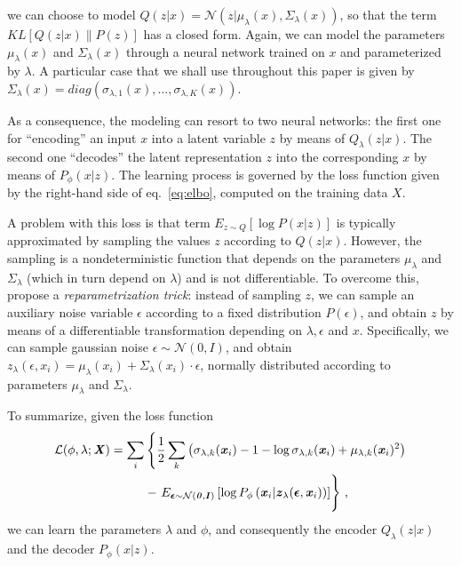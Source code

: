 \documentclass[sigconf]{acmart}
\newcommand{\bs}[1]{\ensuremath{\bm{\mathit{#1}}}}
\numberwithin{equation}{section}
\begin{document}
we can choose to model  $Q(\bs{z}|\bs{x}) = \mathcal{N}(\bs{z}|\mu_\lambda(\bs{x}),
\Sigma_\lambda(\bs{x}))$, so that the term $\mathit{KL}\left[Q(\bs{z}|\bs{x})  \|
  P(\bs{z})\right]$ has a closed form.  
Again, we can model the parameters $\mu_\lambda(\bs{x})$
and $\Sigma_\lambda(\bs{x})$ through a neural
network trained on $\bs{x}$ and parameterized by $\lambda$. A
particular case that we shall use throughout this paper is given by 
$\bs{\Sigma}_\lambda (\bs{x}) = \mathit{diag}\left(\sigma_{\lambda,1}
  (\bs{x}), \ldots, \sigma_{\lambda,K} (\bs{x})\right)$. 

As a consequence, the modeling can resort to two neural networks: the
first one for ``encoding'' an input $\bs{x}$ into a latent variable
$\bs{z}$ by means of $Q_\lambda(\bs{z} |\bs{x})$. The second one
``decodes'' the latent representation $\bs{z}$ into the corresponding
$\bs{x}$ by means of $P_\phi(\bs{x}|\bs{z})$. The learning process is
governed by the loss function given by the right-hand side of
eq.~\ref{eq:elbo}, computed on the training data \bs{X}.

A problem with this loss is that term $E_{\bs{z}\sim Q}[\log
P(\bs{x}|\bs{z})]$ is typically approximated by 
sampling the values $\bs{z}$ according to $Q(\bs{z} |\bs{x})$. However, the 
sampling is a nondeterministic function that depends on the parameters
$\bs{\mu}_\lambda$ and $\bs{\Sigma}_\lambda$ (which in turn depend on $\lambda$) and
is not differentiable. To overcome 
this, \cite{kingma14} propose a \emph{reparametrization trick}: instead
of sampling \bs{z}, we can sample an auxiliary noise variable
\bs{\epsilon} according to a fixed distribution $P(\bs{\epsilon})$,
and obtain \bs{z} by means of a differentiable transformation
depending on $\lambda, \bs{\epsilon}$ and $\bs{x}$. Specifically, we can sample
gaussian noise $\bs{\epsilon} \sim \mathcal{N}(\bs{0}, \bs{I})$, and
obtain $\bs{z}_\lambda(\bs{\epsilon},\bs{x}_i) =
\bs{\mu}_\lambda(\bs{x}_i) +
\bs{\Sigma}_\lambda(\bs{x}_i)\cdot\bs{\epsilon}$,   normally 
distributed according to parameters $\bs{\mu}_\lambda$ and $\bs{\Sigma}_\lambda$. 

To summarize, given the loss function
\begin{equation}\label{eq:vaeloss}
\begin{split}
\mathcal{L}(\phi, \lambda; \bs{X})  =  \sum_i &\left\{  
\frac{1}{2}
    \sum_k \left(\sigma_{\lambda,k} (\bs{x}_i)  - 1 - 
      \log\sigma_{\lambda,k}(\bs{x}_i) 
    + \mu_{\lambda,k}(\bs{x}_i)^2
\right)\right.\\
& - \left.
\vphantom{\sum_{k} k} E_{\bs{\epsilon} \sim \mathcal{N}(\bs{0}, \bs{I})} \left[
    \log P_\phi\left(\bs{x}_i | \bs{z}_\lambda(\bs{\epsilon}, \bs{x}_i)\right) \right]
\right\} \, ,
\end{split}
\end{equation}
we can learn the parameters $\lambda$ and $\phi$, and consequently
the encoder $Q_\lambda(\bs{z} | \bs{x})$ and the decoder
$P_\phi(\bs{x} | \bs{z})$. 
\end{document}
